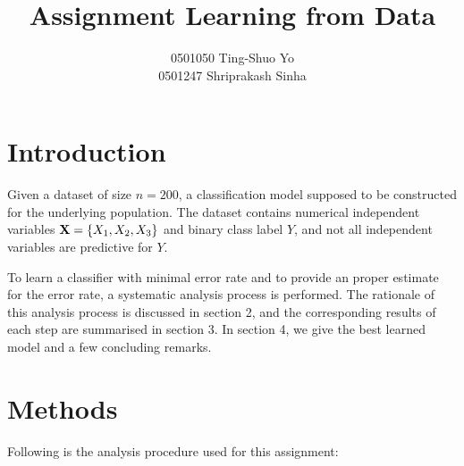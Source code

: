 \documentclass[a4paper,12pt]{article}
\title{{\bf Assignment Learning from Data}}
\author{0501050 \hspace{42pt} Ting-Shuo Yo\\
        0501247 \hspace{16pt} Shriprakash Sinha}
\date{}
\begin{document}
\maketitle


\section{Introduction}
Given a dataset of size $n=200$, a classification model supposed to be constructed for the underlying population. The dataset contains numerical independent variables ${\bf X}=\{X_1,X_2,X_3\}$ and binary class label $Y$, and not all independent variables are predictive for $Y$.

To learn a classifier with minimal error rate and to provide an proper estimate for the error rate, a systematic analysis process is performed.  The rationale of this analysis process is discussed in section 2, and the corresponding results of each step are summarised in section 3.  In section 4, we give the best learned model and a few concluding remarks.

\section{Methods}
Following is the analysis procedure used for this assignment:
\end{document}
